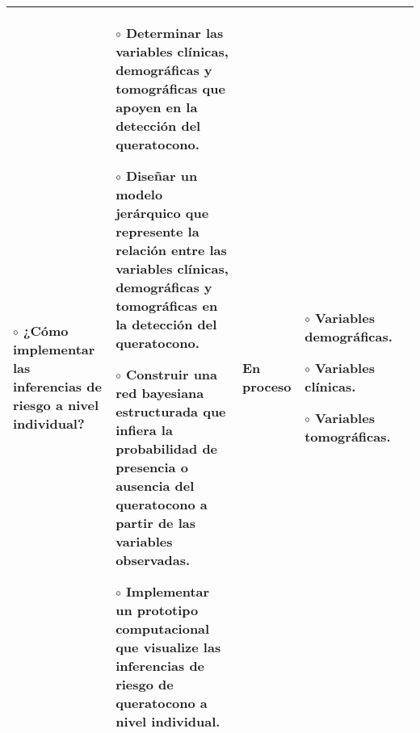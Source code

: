 \begin{landscape}
\begin{table}[h!]
\begin{tabular}{|p{4.2cm}|p{4.5cm}|p{4.5cm}|p{3cm}|p{4.2cm}|}
{    $\circ$ ¿Cómo implementar las inferencias de riesgo a nivel individual?} & \multicolumn{1}{p{4.5cm}|}{
    $\circ$ Determinar las variables clínicas, demográficas y tomográficas que apoyen en la detección del queratocono.\vspace{0.2cm}

    $\circ$ Diseñar un modelo jerárquico que represente la relación entre las variables clínicas, demográficas y tomográficas en la detección del queratocono.\vspace{0.2cm}

    $\circ$ Construir una red bayesiana estructurada que infiera la probabilidad de presencia o ausencia del queratocono a partir de las variables observadas.\vspace{0.2cm}

    $\circ$ Implementar un prototipo computacional que visualize las inferencias de riesgo de queratocono a nivel individual.

    } & \multicolumn{1}{p{4.5cm}|}{
    En proceso

    } & \multicolumn{1}{p{3cm}|}{
    \vspace{0.2cm}
    $\circ$ Variables demográficas.\vspace{0.2cm}

    $\circ$ Variables clínicas.\vspace{0.2cm}

    $\circ$ Variables tomográficas.
    }  & \\ \hline
\end{tabular}
\end{table}

\end{landscape}

